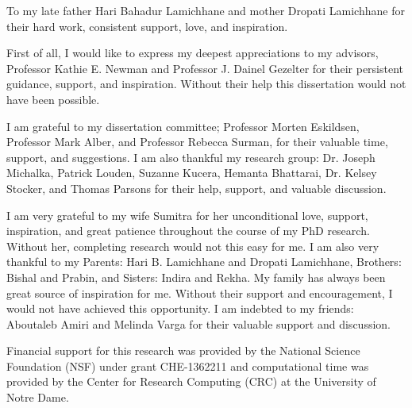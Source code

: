 \documentclass[final,numrefs,sort&compress,noinfo, twoadvisors]{nddiss2e}
\begin{document}
\begin{dedication}
  To my late father Hari Bahadur Lamichhane and mother Dropati Lamichhane for their hard work, consistent support, love, and inspiration. 
\end{dedication}

\tableofcontents
\listoffigures
\listoftables

%

\begin{acknowledge}
First of all, I would like to express my deepest appreciations to my advisors, Professor Kathie E. Newman and Professor J. Dainel Gezelter for their persistent guidance, support, and inspiration. Without their help this dissertation would not have been possible.

I am grateful to my dissertation committee; Professor Morten Eskildsen, Professor Mark Alber, and Professor Rebecca Surman, for their valuable time, support, and suggestions. I am also thankful my research group: Dr. Joseph Michalka, Patrick Louden, Suzanne Kucera, Hemanta Bhattarai, Dr. Kelsey Stocker, and Thomas Parsons for their help, support, and valuable discussion.

I am very grateful to my wife Sumitra for her unconditional love, support, inspiration, and great patience throughout the course of my PhD research.  Without her, completing research would not this easy for me. I am also very thankful to my Parents: Hari B. Lamichhane and Dropati Lamichhane,  Brothers: Bishal and Prabin, and  Sisters: Indira and Rekha. My family has always been great source of inspiration for me. Without their support and encouragement, I would not have achieved this opportunity. I am indebted to my friends: Aboutaleb Amiri and Melinda Varga for their valuable support and discussion.

Financial support for this research was provided by the National Science Foundation (NSF) under grant CHE-1362211 and computational time was provided by the Center for Research Computing (CRC) at the University of Notre Dame.
\end{acknowledge}
\end{document}
